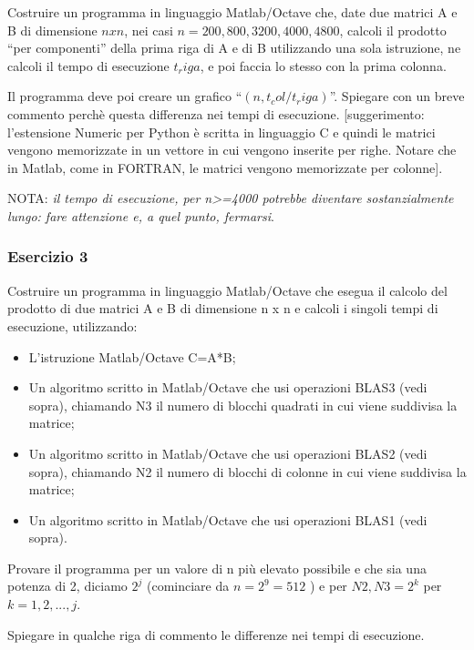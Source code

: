 Costruire un programma in linguaggio Matlab/Octave che, date due matrici A e B di dimensione $n x n$, nei casi $n = 200, 800, 3200, 4000, 4800$, calcoli il prodotto ``per componenti'' della prima riga di A e di B utilizzando una sola istruzione, ne calcoli il tempo di esecuzione $t_riga$, e poi faccia lo stesso con la prima colonna. 

Il programma deve poi creare un grafico ``$(n, t_col / t_riga)$''.  Spiegare con un breve commento perchè questa differenza nei tempi di esecuzione.  [suggerimento: l'estensione Numeric per Python è scritta in linguaggio C e quindi le matrici vengono memorizzate in un vettore in cui vengono inserite per righe.  Notare che in Matlab, come in FORTRAN, le matrici vengono memorizzate per colonne].

NOTA: \textit{il tempo di esecuzione, per n>=4000 potrebbe diventare sostanzialmente lungo: fare attenzione e, a quel punto, fermarsi}.



\subsubsection{Esercizio 3}

Costruire un programma in linguaggio Matlab/Octave che esegua il calcolo del prodotto di due  matrici A e B di dimensione n x n e calcoli i singoli tempi di esecuzione, utilizzando:

\begin{itemize}

	\item L'istruzione Matlab/Octave C=A*B;
	\item Un algoritmo scritto in Matlab/Octave che usi operazioni BLAS3 (vedi sopra), chiamando N3 il numero di blocchi quadrati in cui viene suddivisa la matrice;
	\item Un algoritmo scritto in Matlab/Octave che usi operazioni BLAS2 (vedi sopra), chiamando N2 il numero di blocchi di colonne in cui viene suddivisa la matrice;
	\item Un algoritmo scritto in Matlab/Octave che usi operazioni BLAS1 (vedi sopra).

\end{itemize}

Provare il programma per un valore di n più elevato possibile e che sia una potenza di 2, diciamo $2^j$ (cominciare da $n = 2^9 = 512$ ) e per $N2,N3 = 2^k$ per $k=1,2,...,j$. 

Spiegare in qualche riga di commento le differenze nei tempi di esecuzione.

